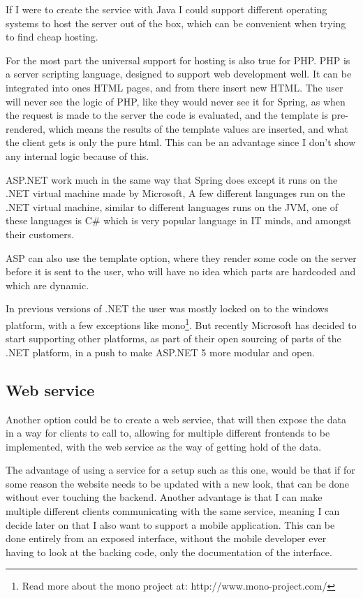If I were to create the service with Java I could support different operating systems to host the server out of the box, which can be convenient when trying to find cheap hosting.

For the most part the universal support for hosting is also true for PHP. PHP is a server scripting language\cite{php-home}, designed to support web development well. It can be integrated into ones HTML pages, and from there insert new HTML. The user will never see the logic of PHP, like they would never see it for Spring, as when the request is made to the server the code is evaluated, and the template is pre-rendered, which means the results of the template values are inserted, and what the client gets is only the pure html. This can be an advantage since I don't show any internal logic because of this.

ASP.NET work much in the same way that Spring does except it runs on the .NET virtual machine made by Microsoft, A few different languages run on the .NET virtual machine, similar to different languages runs on the JVM, one of these languages is C\# which is very popular language in IT minds, and amongst their customers.

ASP can also use the template option, where they render some code on the server before it is sent to the user, who will have no idea which parts are hardcoded and which are dynamic.

In previous versions of .NET the user was mostly locked on to the windows platform, with a few exceptions like mono\footnote{Read more about the mono project at: http://www.mono-project.com/}. But recently Microsoft has decided to start supporting other platforms, as part of their open sourcing of parts of the .NET platform\cite{.net-core}, in a push to make ASP.NET 5 more modular and open.

\subsection{Web service}
\label{sub:Web service}
Another option could be to create a web service, that will then expose the data in a way for clients to call to, allowing for multiple different frontends to be implemented, with the web service as the way of getting hold of the data.

The advantage of using a service for a setup such as this one, would be that if for some reason the website needs to be updated with a new look, that can be done without ever touching the backend. Another advantage is that I can make multiple different clients communicating with the same service, meaning I can decide later on that I also want to support a mobile application. This can be done entirely from an exposed interface, without the mobile developer ever having to look at the backing code, only the documentation of the interface.

